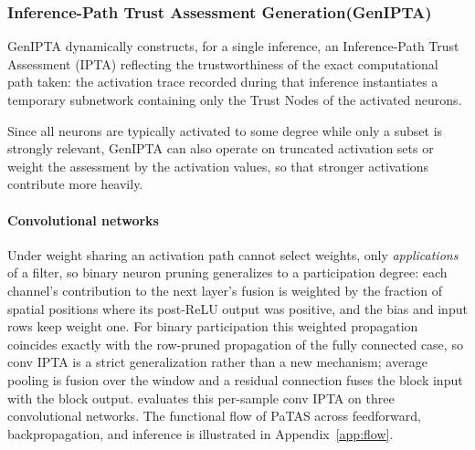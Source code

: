 \subsubsection{Inference-Path Trust Assessment Generation(GenIPTA)}

GenIPTA dynamically constructs, for a single inference, an Inference-Path Trust Assessment (IPTA) reflecting the trustworthiness of the exact computational path taken: the activation trace recorded during that inference instantiates a temporary subnetwork containing only the Trust Nodes of the activated neurons. 

Since all neurons are typically activated to some degree while only a subset is strongly relevant, GenIPTA can also operate on truncated activation sets or weight the assessment by the activation values, so that stronger activations contribute more heavily.

\paragraph*{Convolutional networks} Under weight sharing an activation path cannot select weights, only \emph{applications} of a filter, so binary neuron pruning generalizes to a participation degree: each channel's contribution to the next layer's fusion is weighted by the fraction of spatial positions where its post-ReLU output was positive, and the bias and input rows keep weight one. For binary participation this weighted propagation coincides exactly with the row-pruned propagation of the fully connected case, so conv IPTA is a strict generalization rather than a new mechanism; average pooling is fusion over the window and a residual connection fuses the block input with the block output.  evaluates this per-sample conv IPTA on three convolutional networks. The functional flow of PaTAS across feedforward, backpropagation, and inference is illustrated in Appendix~\ref{app:flow}.

\vspace{-0.5em}
